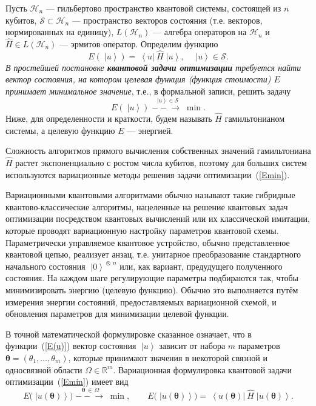 \documentclass[a4paper]{report}
\newcommand{\ket}[1] {\!\!\;\ensuremath{\left|#1\right\rangle}}
\newcommand{\bra}[1] {\!\!\:\ensuremath{\left\langle#1\right|\!\!\:}}
\begin{document}
Пусть $\mathcal{H}_n$ --- гильбертово пространство квантовой системы, состоящей из $n$ кубитов, ${\mathcal{S}\subset\mathcal{H}_n}$ --- пространство векторов состояния (т.е. векторов, нормированных на единицу), $L(\mathcal{H}_n)$ --- алгебра операторов на $\mathcal{H}_n$ и ${\hat{H}\in L(\mathcal{H}_n)}$ --- эрмитов оператор. Определим функцию
\begin{equation}\label{E(u)}
  E(\ket{u})=\bra{u}\hat{H}\ket{u},\quad \ket{u}\in\mathcal{S}.
\end{equation}
\textit{В простейшей постановке \textbf{квантовой задачи оптимизации} требуется найти вектор состояния, на котором целевая функция (функция стоимости) $E$ принимает минимальное значение}, т.е., в формальной записи, решить задачу
\begin{equation}\label{Emin}
  E(\ket{u})\; \stackrel{\ket{u}\in\mathcal{S}}{-\!-\!\!\!\longrightarrow}\; \min.
\end{equation}
Ниже, для определенности и краткости, будем называть $\hat{H}$ гамильтонианом системы, а целевую функцию $E$ --- энергией.

Сложность алгоритмов прямого вычисления собственных значений гамильтониана $\hat{H}$ растет экспоненциально с ростом числа кубитов, поэтому для больших систем используются вариационные методы решения задачи оптимизации~(\ref{Emin}).

Вариационными квантовыми алгоритмами обычно называют такие гибридные квантово-классические алгоритмы, нацеленные на решение квантовых задач оптимизации посредством квантовых вычислений или их классической имитации, которые проводят вариационную настройку параметров квантовой схемы. Параметрически управляемое квантовое устройство, обычно представленное квантовой цепью, реализует анзац, т.е. унитарное преобразование стандартного начального состояния ${\ket{0}^{\!\otimes\:\! n}}$ или, как вариант, предудущего полученного состояния. На каждом шаге регулирующие параметры подбираются так, чтобы минимизировать энергию (целевую функцию). Обычно это выполняется путём измерения энергии состояний, предоставляемых вариационной схемой, и обновления параметров для минимизации целевой функции.

В точной математической формулировке сказанное означает, что в функции~(\ref{E(u)}) вектор состояния $\ket{u}$ зависит от набора $m$ параметров $\bm\theta=(\theta_1, \ldots,\theta_m)$, которые принимают значения в некоторой связной и односвязной области $\Omega\in\mathbb{R}^m$. Вариационная формулировка квантовой задачи оптимизации~(\ref{Emin}) имеет вид
\begin{equation}\label{Emin-theta}
  E\big(\ket{u(\bm\theta)}\big)\; \stackrel{\bm\theta\,\in\,\Omega}{-\!-\!\!\!\longrightarrow}\; \min, \qquad E\big(\ket{u(\bm\theta)}\big)=\bra{u(\bm\theta)}\hat{H}\ket{u(\bm\theta)}.
\end{equation}
\end{document}
